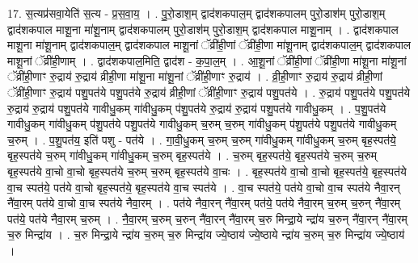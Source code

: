 \documentclass[17pt]{extarticle}
\begin{document}
17. स॒त्यप्र॑सवा॒येति॑ स॒त्य - प्र॒स॒वा॒य॒ । . पु॒रो॒डाश॒म् द्वाद॑शकपाल॒म् द्वाद॑शकपालम् पुरो॒डाश॑म् पुरो॒डाश॒म् द्वाद॑शकपाल माशू॒ना मा॑शू॒नाम् द्वाद॑शकपालम् पुरो॒डाश॑म् पुरो॒डाश॒म् द्वाद॑शकपाल माशू॒नाम् । . द्वाद॑शकपाल माशू॒ना मा॑शू॒नाम् द्वाद॑शकपाल॒म् द्वाद॑शकपाल माशू॒नां ॅव्री॑ही॒णां ॅव्री॑ही॒णा मा॑शू॒नाम् द्वाद॑शकपाल॒म् द्वाद॑शकपाल माशू॒नां ॅव्री॑ही॒णाम् । . द्वाद॑शकपाल॒मिति॒ द्वाद॑श - क॒पा॒ल॒म् । . आ॒शू॒नां ॅव्री॑ही॒णां ॅव्री॑ही॒णा मा॑शू॒ना मा॑शू॒नां ॅव्री॑ही॒णाꣳ रु॒द्राय॑ रु॒द्राय॑ व्रीही॒णा मा॑शू॒ना मा॑शू॒नां ॅव्री॑ही॒णाꣳ रु॒द्राय॑ । . व्री॒ही॒णाꣳ रु॒द्राय॑ रु॒द्राय॑ व्रीही॒णां ॅव्री॑ही॒णाꣳ रु॒द्राय॑ पशु॒पत॑ये पशु॒पत॑ये रु॒द्राय॑ व्रीही॒णां ॅव्री॑ही॒णाꣳ रु॒द्राय॑ पशु॒पत॑ये । . रु॒द्राय॑ पशु॒पत॑ये पशु॒पत॑ये रु॒द्राय॑ रु॒द्राय॑ पशु॒पत॑ये गावीधु॒कम् गा॑वीधु॒कम् प॑शु॒पत॑ये रु॒द्राय॑ रु॒द्राय॑ पशु॒पत॑ये गावीधु॒कम् । . प॒शु॒पत॑ये गावीधु॒कम् गा॑वीधु॒कम् प॑शु॒पत॑ये पशु॒पत॑ये गावीधु॒कम् च॒रुम् च॒रुम् गा॑वीधु॒कम् प॑शु॒पत॑ये पशु॒पत॑ये गावीधु॒कम् च॒रुम् । . प॒शु॒पत॑य॒ इति॑ पशु - पत॑ये । . गा॒वी॒धु॒कम् च॒रुम् च॒रुम् गा॑वीधु॒कम् गा॑वीधु॒कम् च॒रुम् बृह॒स्पत॑ये॒ बृह॒स्पत॑ये च॒रुम् गा॑वीधु॒कम् गा॑वीधु॒कम् च॒रुम् बृह॒स्पत॑ये । . च॒रुम् बृह॒स्पत॑ये॒ बृह॒स्पत॑ये च॒रुम् च॒रुम् बृह॒स्पत॑ये वा॒चो वा॒चो बृह॒स्पत॑ये च॒रुम् च॒रुम् बृह॒स्पत॑ये वा॒चः । . बृह॒स्पत॑ये वा॒चो वा॒चो बृह॒स्पत॑ये॒ बृह॒स्पत॑ये वा॒च स्पत॑ये॒ पत॑ये वा॒चो बृह॒स्पत॑ये॒ बृह॒स्पत॑ये वा॒च स्पत॑ये । . वा॒च स्पत॑ये॒ पत॑ये वा॒चो वा॒च स्पत॑ये नैवा॒रन् नै॑वा॒रम् पत॑ये वा॒चो वा॒च स्पत॑ये नैवा॒रम् । . पत॑ये नैवा॒रन् नै॑वा॒रम् पत॑ये॒ पत॑ये नैवा॒रम् च॒रुम् च॒रुन् नै॑वा॒रम् पत॑ये॒ पत॑ये नैवा॒रम् च॒रुम् । . नै॒वा॒रम् च॒रुम् च॒रुन् नै॑वा॒रन् नै॑वा॒रम् च॒रु मिन्द्रा॒ये न्द्रा॑य च॒रुन् नै॑वा॒रन् नै॑वा॒रम् च॒रु मिन्द्रा॑य । . च॒रु मिन्द्रा॒ये न्द्रा॑य च॒रुम् च॒रु मिन्द्रा॑य ज्ये॒ष्ठाय॑ ज्ये॒ष्ठाये न्द्रा॑य च॒रुम् च॒रु मिन्द्रा॑य ज्ये॒ष्ठाय॑ । \newline
\end{document}
